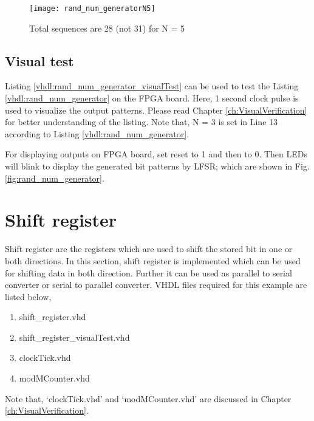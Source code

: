 \begin{explanation}
	\begin{figure}[!h]
		\centering
		\texttt{[image: rand\_num\_generatorN5]}
		\caption{Total sequences are 28 (not 31) for N = 5}
		\label{fig:rand_num_generatorN5}
	\end{figure}
\end{explanation}




\subsection{Visual test}
Listing \ref{vhdl:rand_num_generator_visualTest} can be used to test the Listing \ref{vhdl:rand_num_generator} on the FPGA board. Here, 1 second clock pulse is used to visualize the output patterns. Please read Chapter \ref{ch:VisualVerification} for better understanding of the listing. Note that,  N = 3 is set in Line 13 according to Listing \ref{vhdl:rand_num_generator}.

For displaying outputs on FPGA board, set reset to 1 and then to 0. Then LEDs will blink to display the generated bit patterns by LFSR; which are shown in Fig. \ref{fig:rand_num_generator}. 




\section{Shift register}\label{sec:shiftrg}
Shift register are the registers which  are used to shift the stored bit in one or both directions. In this section, shift register is implemented which can be used for shifting data in both direction. Further it can be used as parallel to serial converter or serial to parallel converter. VHDL files required for this example are listed below, 
\begin{enumerate}
	\item shift\_register.vhd
	\item shift\_register\_visualTest.vhd
	\item clockTick.vhd
	\item modMCounter.vhd
\end{enumerate}
Note that, `clockTick.vhd' and `modMCounter.vhd' are discussed in Chapter \ref{ch:VisualVerification}.

